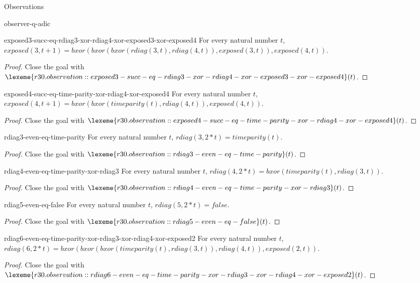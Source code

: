 \begin{lexlean}{Observations}
\begin{section}{observer-q-adic}
\begin{theorem}{exposed3-succ-eq-rdiag3-xor-rdiag4-xor-exposed3-xor-exposed4}
For every natural number \(t\), \(exposed(3, t + 1) = bxor(bxor(bxor(rdiag(3, t), rdiag(4, t)), exposed(3, t)), exposed(4, t))\).
\begin{proof}
Close the goal with \(\lexeme{r30.observation::exposed3-succ-eq-rdiag3-xor-rdiag4-xor-exposed3-xor-exposed4}(t)\).
\end{proof}
\end{theorem}

\begin{theorem}{exposed4-succ-eq-time-parity-xor-rdiag4-xor-exposed4}
For every natural number \(t\), \(exposed(4, t + 1) = bxor(bxor(timeparity(t), rdiag(4, t)), exposed(4, t))\).
\begin{proof}
Close the goal with \(\lexeme{r30.observation::exposed4-succ-eq-time-parity-xor-rdiag4-xor-exposed4}(t)\).
\end{proof}
\end{theorem}

\begin{theorem}{rdiag3-even-eq-time-parity}
For every natural number \(t\), \(rdiag(3, 2 * t) = timeparity(t)\).
\begin{proof}
Close the goal with \(\lexeme{r30.observation::rdiag3-even-eq-time-parity}(t)\).
\end{proof}
\end{theorem}

\begin{theorem}{rdiag4-even-eq-time-parity-xor-rdiag3}
For every natural number \(t\), \(rdiag(4, 2 * t) = bxor(timeparity(t), rdiag(3, t))\).
\begin{proof}
Close the goal with \(\lexeme{r30.observation::rdiag4-even-eq-time-parity-xor-rdiag3}(t)\).
\end{proof}
\end{theorem}

\begin{theorem}{rdiag5-even-eq-false}
For every natural number \(t\), \(rdiag(5, 2 * t) = false\).
\begin{proof}
Close the goal with \(\lexeme{r30.observation::rdiag5-even-eq-false}(t)\).
\end{proof}
\end{theorem}

\begin{theorem}{rdiag6-even-eq-time-parity-xor-rdiag3-xor-rdiag4-xor-exposed2}
For every natural number \(t\), \(rdiag(6, 2 * t) = bxor(bxor(bxor(timeparity(t), rdiag(3, t)), rdiag(4, t)), exposed(2, t))\).
\begin{proof}
Close the goal with \(\lexeme{r30.observation::rdiag6-even-eq-time-parity-xor-rdiag3-xor-rdiag4-xor-exposed2}(t)\).
\end{proof}
\end{theorem}


\end{section}
\end{lexlean}
